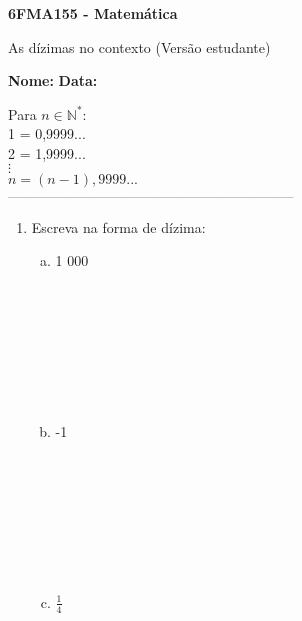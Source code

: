 \documentclass[a4paper,14pt]{article}
\begin{document}
	
	\noindent\textbf{6FMA155 - Matemática} 
	
	\begin{center}As dízimas no contexto (Versão estudante)
	\end{center}
	
	\noindent\textbf{Nome:} \underline{\hspace{10cm}}
	\noindent\textbf{Data:} \underline{\hspace{4cm}}
	
	
	\begin{multicols}{2}
	    \noindent Para $n \in \mathbb{N}^*$: \\
	    1 = 0,9999... \\
	    2 = 1,9999... \\
	    $\vdots$ \\
	    $n = (n - 1),9999...$ \\
		\noindent\textsubscript{--------------------------------------------------------------------------}
		\begin{enumerate} 
			\item Escreva na forma de dízima:
			\begin{enumerate}[a)]
				\item 1 000 \\\\\\\\\\\\\\\\
				\item -1 \\\\\\\\\\\\\\\\
				\item $\frac{1}{4}$ \\\\\\\\\\\\\\\\

\end{enumerate}
\end{enumerate}
\end{multicols}
\end{document}
